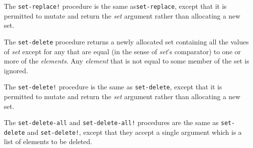\begin{entry}{%
  }

  The \texttt{set-replace!} procedure is the same
  as\texttt{set-replace}, except that it is permitted to mutate and
  return the \emph{set} argument rather than allocating a new set.
\end{entry}

\begin{entry}{%
  }

  The \texttt{set-delete} procedure returns a newly allocated set
  containing all the values of \emph{set} except for any that are
  equal (in the sense of \emph{set}'s comparator) to one or more of
  the \emph{elements}. Any \emph{element} that is not equal to some
  member of the set is ignored.

  The \texttt{set-delete!} procedure is the same as
  \texttt{set-delete}, except that it is permitted to mutate and
  return the \emph{set} argument rather than allocating a new set.

  The \texttt{set-delete-all} and \texttt{set-delete-all!} procedures
  are the same as \texttt{set-delete} and \texttt{set-delete!}, except
  that they accept a single argument which is a list of elements to be
  deleted.
\end{entry}

